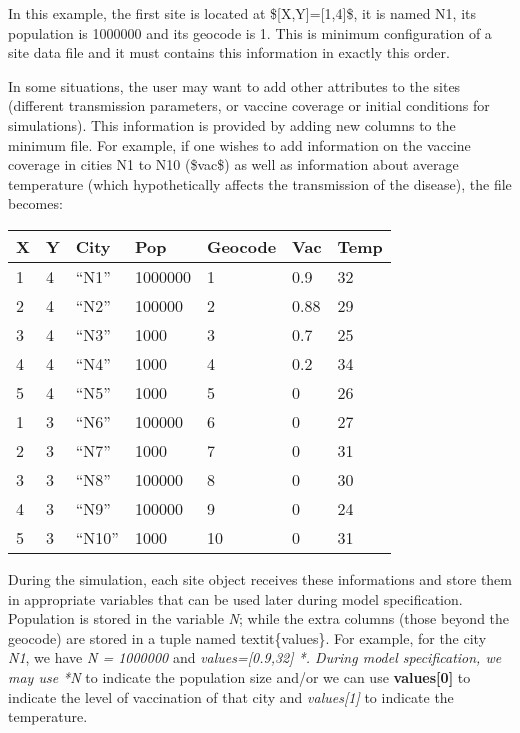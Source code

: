 \documentclass[a4paper,10pt]{manual}
\begin{document}
In this example, the first site is located at \${[}X,Y{]}={[}1,4{]}\$, it is named N1, its population is 1000000 and its geocode is 1. This is minimum configuration of a site data file and it must contains this information in exactly this order.

In some situations, the user may want to add other attributes to the sites (different transmission parameters, or vaccine coverage or initial conditions for simulations). This information is provided by adding new columns to the minimum file. For example, if one wishes to add information on the vaccine coverage in cities N1 to N10 (\$vac\$) as well as information about average temperature (which hypothetically affects the transmission of the disease), the file becomes:

\begin{tabulary}{\textwidth}{|L|L|L|L|L|L|L|}
\hline
\textbf{
X
} & \textbf{
Y
} & \textbf{
City
} & \textbf{
Pop
} & \textbf{
Geocode
} & \textbf{
Vac
} & \textbf{
Temp
}\\
\hline

1
 & 
4
 & 
``N1''
 & 
1000000
 & 
1
 & 
0.9
 & 
32
\\

2
 & 
4
 & 
``N2''
 & 
100000
 & 
2
 & 
0.88
 & 
29
\\

3
 & 
4
 & 
``N3''
 & 
1000
 & 
3
 & 
0.7
 & 
25
\\

4
 & 
4
 & 
``N4''
 & 
1000
 & 
4
 & 
0.2
 & 
34
\\

5
 & 
4
 & 
``N5''
 & 
1000
 & 
5
 & 
0
 & 
26
\\

1
 & 
3
 & 
``N6''
 & 
100000
 & 
6
 & 
0
 & 
27
\\

2
 & 
3
 & 
``N7''
 & 
1000
 & 
7
 & 
0
 & 
31
\\

3
 & 
3
 & 
``N8''
 & 
100000
 & 
8
 & 
0
 & 
30
\\

4
 & 
3
 & 
``N9''
 & 
100000
 & 
9
 & 
0
 & 
24
\\

5
 & 
3
 & 
``N10''
 & 
1000
 & 
10
 & 
0
 & 
31
\\
\hline
\end{tabulary}


During the simulation, each site object receives these informations and store them in appropriate variables that can be used later during model specification. Population is stored in the variable  \emph{N}; while the extra columns (those beyond the geocode) are stored in a tuple named textit\{values\}. For example, for the city  \emph{N1}, we have  \emph{N = 1000000} and  \emph{values={[}0.9,32{]} *. During model specification, we may use  *N} to indicate the population size and/or we can use \textbf{values{[}0{]}} to indicate the level of vaccination of that city and \emph{values{[}1{]}} to indicate the temperature.
\end{document}
